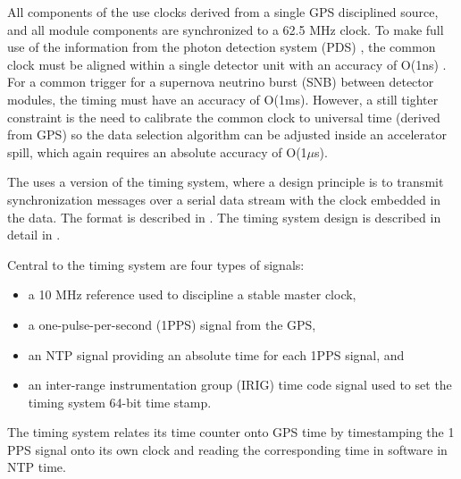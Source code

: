 All components of the  use clocks derived
from a single GPS disciplined source, and all module components
are synchronized to a 62.5 MHz clock. To make full use of the
information from the photon detection system (PDS)  , the common clock
must be aligned within a single detector unit with an accuracy of
O(1ns)  . For a common trigger for a supernova neutrino burst
(SNB)  between detector modules, the timing must have
an accuracy of O(1ms). However, a still tighter constraint is
the need to calibrate the common clock to universal time (derived from
GPS)  so the data selection algorithm can be adjusted inside an
accelerator spill, which again requires an absolute accuracy of O(1$\mu$s).

The   uses a version of the  timing
system, where a design principle is to transmit synchronization messages over
a serial data stream with the clock embedded in the data. The format
is described in \cite{docid-1651}. The timing system design is
described in detail in \cite{docid-11233}.

Central to the timing system are four types of signals:
\begin{itemize}
\item a 10 MHz reference used to discipline a stable master clock,
\item a one-pulse-per-second (1PPS) signal from the GPS,
\item an NTP signal providing an absolute time for each 1PPS signal, and
\item an inter-range instrumentation group (IRIG) time code signal
  used to set the timing system 64-bit time stamp.
\end{itemize}
The timing system relates its time counter onto GPS  time by
timestamping the 1 PPS signal onto its own clock and reading
the corresponding time in software in NTP time.

